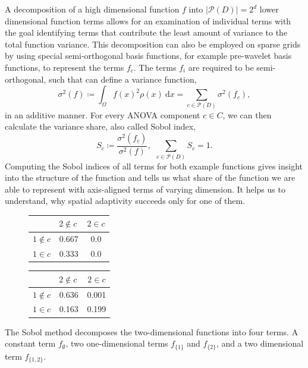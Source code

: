 \documentclass[
  a4paper,  %
  twoside,  %
  bibliography=totoc,
  headsepline,
  cleardoublepage=empty,
  parskip=half,
  draft=false
]{scrbook}
\begin{document}
A decomposition of a high dimensional function $f$ into $|\mathcal{P}(D)|=2^d$ lower dimensional function terms allows for an examination of individual terms with the goal identifying terms that contribute the least amount of variance to the total function variance.
This decomposition can also be employed on sparse grids \cite{Feuersaenger2010} by using special semi-orthogonal basis functions, for example pre-wavelet basis functions, to represent the terms $f_c$.
The terms $f_i$ are required to be semi-orthogonal, such that can define a variance function,
\begin{equation}
\sigma^2(f) \coloneqq \int_{\Omega} f(x)^2 \rho(x) ~ \text{d} x=\sum_{c \in \mathcal{P}(D)} \sigma^2(f_c),
\end{equation}
in an additive manner.
For every ANOVA component $c \in C$, we can then calculate the variance share, also called Sobol index,
\begin{equation}
S_{c} \coloneqq \frac{\sigma^2(f_{\underline{c}} )}{\sigma^2(f)}, ~~ \sum_{c \in \mathcal{P}(D)} S_{c} = 1.
\end{equation}
Computing the Sobol indices of all terms for both example functions gives insight into the structure of the function and tells us what share of the function we are able to represent with axis-aligned terms of varying dimension.
It helps us to understand, why spatial adaptivity succeeds only for one of them.

\begin{mdframed}[style=style]
\begin{figure}[H]
        \centering
\begin{minipage}[H]{.45\textwidth}
  \centering
  \begin{tabular}{ l | c c }
& $2 \notin c~$ & $2 \in c$ \\
\hline
$1 \notin c$ & 0.667 & 0.0\\
$1 \in c$ & 0.333 & 0.0\\
\end{tabular}
\delimit
  \label{tab:anova_f1}
    \end{minipage}%
    \hspace{.05\textwidth}
    \begin{minipage}[H]{0.45\textwidth}
  \centering
  \begin{tabular}{ l | c c }
& $2 \notin c~$ & $2 \in c$ \\
\hline
$1 \notin c$ & 0.636 & 0.001\\
$1 \in c$ & 0.163 & 0.199\\
\end{tabular}
\delimit
  \label{tab:anova_f2}
    \end{minipage}
\end{figure}
\end{mdframed}
%
The Sobol method decomposes the two-dimensional functions into four terms.
A constant term $f_\emptyset$, two one-dimensional terms $f_{\{1\}}$ and $f_{\{2\}}$, and a two dimensional term $f_{\{1,2\}}$.
\end{document}

